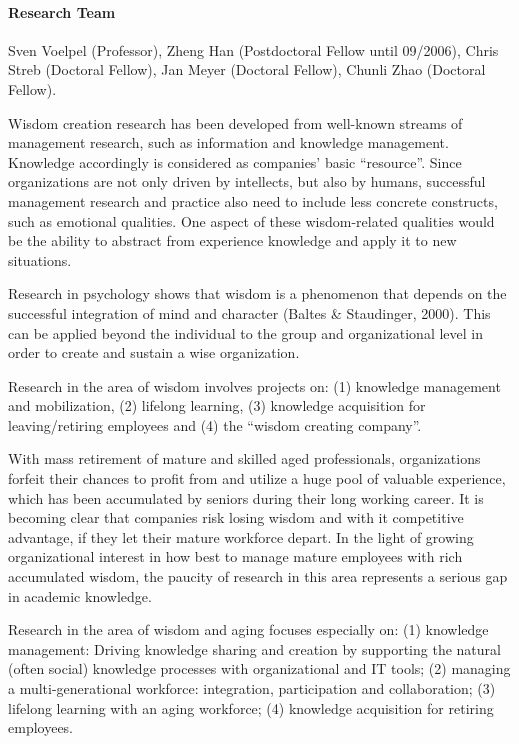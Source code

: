 


\paragraph{Research Team}
Sven Voelpel (Professor), Zheng Han (Postdoctoral Fellow until 09/2006), Chris Streb (Doctoral Fellow), Jan Meyer (Doctoral Fellow), Chunli Zhao (Doctoral Fellow).

 Wisdom creation research has been developed from well-known streams of management research, such as information and knowledge management. Knowledge accordingly is considered as companies' basic ``resource''. Since organizations are not only driven by intellects, but also by humans, successful management research and practice also need to include less concrete constructs, such as emotional qualities. One aspect of these wisdom-related qualities would be the ability to abstract from experience knowledge and apply it to new situations.

 Research in psychology shows that wisdom is a phenomenon that depends on the successful integration of mind and character (Baltes \& Staudinger, 2000). This can be applied beyond the individual to the group and organizational level in order to create and sustain a wise organization.

 Research in the area of wisdom involves projects on: (1) knowledge management and mobilization, (2) lifelong learning, (3) knowledge acquisition for leaving/retiring employees and (4) the ``wisdom creating company''.

 With mass retirement of mature and skilled aged professionals, organizations forfeit their chances to profit from and utilize a huge pool of valuable experience, which has been accumulated by seniors during their long working career. It is becoming clear that companies risk losing wisdom and with it competitive advantage, if they let their mature workforce depart. In the light of growing organizational interest in how best to manage mature employees with rich accumulated wisdom, the paucity of research in this area represents a serious gap in academic knowledge.

 Research in the area of wisdom and aging focuses especially on: (1) knowledge management: Driving knowledge sharing and creation by supporting the natural (often social) knowledge processes with organizational and IT tools; (2) managing a multi-generational workforce: integration, participation and collaboration; (3) lifelong learning with an aging workforce; (4) knowledge acquisition for retiring employees. 

